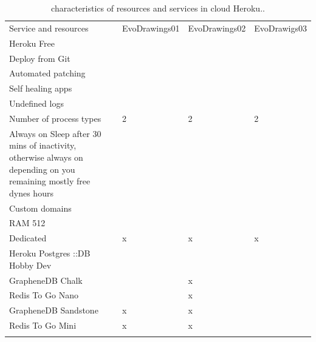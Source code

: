 \begin{table}
	\small
	\caption{characteristics of  resources and services in cloud Heroku..}
	\label{tab:shorurl2} 
	\centering
	\small
	\begin{tabular}{p{4cm} p{3cm} p{3cm} p{3cm}  }
		\hline\noalign{\smallskip}
		Service and resources & EvoDrawings01 & EvoDrawings02 & EvoDrawigs03 \\
		\noalign{\smallskip}\hline\noalign{\smallskip}
		\small{Heroku Free} & \small{\checkmark} & \small{\checkmark} & \small{\checkmark}\\ \hline
		\small{Deploy from Git} & \small{\checkmark} & \small{\checkmark} & \small{\checkmark}\\ \hline
		\small{Automated patching} & \small{\checkmark} & \small{\checkmark} & \small{\checkmark}\\ \hline
		\small{Self healing apps} & \small{\checkmark} & \small{\checkmark} & \small{\checkmark}\\ \hline
		\small{Undefined logs} & \small{\checkmark} & \small{\checkmark} & \small{\checkmark}\\ \hline
		\small{Number of process types} & \small{2} & \small{2} & \small{2}\\ \hline
		\small{Always on Sleep after 30 mins of inactivity, otherwise always on depending on you remaining mostly free dynes hours} & \small{\checkmark} & \small{\checkmark} & \small{\checkmark}\\ \hline
		\small{Custom domains} & \small{\checkmark} & \small{\checkmark} & \small{\checkmark}\\ \hline
		\small{RAM 512} & \small{\checkmark} & \small{\checkmark} & \small{\checkmark}\\ \hline
		\small{Dedicated} & \small{x} & \small{x} & \small{x}\\ \hline
		\small{Heroku Postgres ::DB Hobby Dev} & \small{\checkmark} & \small{\checkmark} & \small{\checkmark}\\ \hline
		\small{GrapheneDB Chalk} & \small{\checkmark} & \small{x} & \small{\checkmark}\\ \hline
		\small{Redis To Go Nano} & \small{\checkmark} & \small{x} & \small{\checkmark}\\ \hline
		\small{GrapheneDB Sandstone} & \small{x} & \small{x} & \small{\checkmark}\\ \hline
		\small{Redis To Go Mini} & \small{x} & \small{x} & \small{\checkmark}\\ \hline
		
		
		\noalign{\smallskip}\hline
	\end{tabular}
\end{table}

